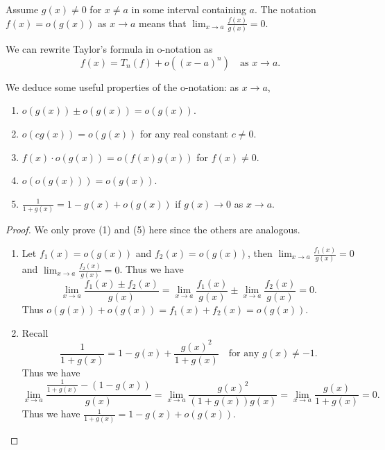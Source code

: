 \documentclass[a4paper]{ctexart}
\begin{document}
        \begin{mydef}
            Assume $g(x)\neq 0$ for $x\neq a$ in some interval containing $a$. The notation $f(x) = o(g(x))$ as $x\to a$ means that $\displaystyle \lim_{x\to a} \frac{f(x)}{g(x)} = 0$.
        \end{mydef}
        \begin{myex}
            We can rewrite Taylor's formula in o-notation as
            \[
            f(x) = T_n(f) + o\left( (x-a)^n \right) \quad \text{as } x\to a.
            \]
        \end{myex}
        \begin{mythm}
            We deduce some useful properties of the o-notation: as $x\to a$,
            \begin{enumerate}[label=(\arabic*)]
                \item $o(g(x)) \pm o(g(x)) = o(g(x)).$
                \item $o(cg(x)) = o(g(x))$ for any real constant $c\neq 0$.
                \item $f(x) \cdot o(g(x)) = o(f(x)g(x))$ for $f(x)\neq 0$.
                \item $o(o(g(x))) = o(g(x))$.
                \item $\displaystyle \frac{1}{1+g(x)} = 1 - g(x) + o(g(x))$ if $g(x)\to 0$ as $x\to a$.
            \end{enumerate}
        \end{mythm}
        \begin{proof}
            We only prove (1) and (5) here since the others are analogous.
            \begin{enumerate}[label=(\arabic*)]
                \item Let $f_1(x) = o(g(x))$ and $f_2(x) = o(g(x))$, then $\displaystyle \lim_{x\to a} \frac{f_1(x)}{g(x)} = 0$ and $\displaystyle \lim_{x\to a} \frac{f_2(x)}{g(x)} = 0$. Thus we have
                \[
                \lim_{x\to a} \frac{f_1(x) \pm f_2(x)}{g(x)} = \lim_{x\to a} \frac{f_1(x)}{g(x)} \pm \lim_{x\to a} \frac{f_2(x)}{g(x)} = 0.
                \]
                Thus $o(g(x)) + o(g(x)) = f_1(x) + f_2(x) = o(g(x))$.
                \item[(5)] Recall
                \[
                \frac{1}{1+g(x)} = 1 - g(x) + \frac{g(x)^2}{1+g(x)}\quad \text{for any } g(x)\neq -1.
                \]
                Thus we have
                \[
                \lim_{x\to a} \frac{\frac{1}{1+g(x)} - (1 - g(x))}{g(x)} = \lim_{x\to a} \frac{g(x)^2}{(1+g(x))g(x)} = \lim_{x\to a} \frac{g(x)}{1+g(x)} = 0.
                \]
                Thus we have $\displaystyle \frac{1}{1+g(x)} = 1 - g(x) + o(g(x))$.
            \end{enumerate}
        \end{proof}
\end{document}
